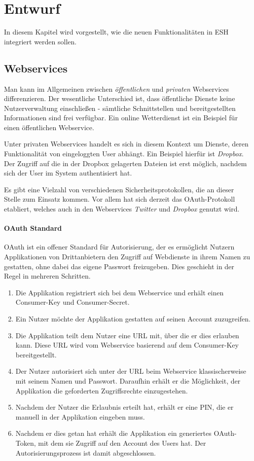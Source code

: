 \chapter{Entwurf}
\label{chap:entwurf}
In diesem Kapitel wird vorgestellt, wie die neuen Funktionalitäten in ESH integriert werden sollen.


\section{Webservices}
Man kann im Allgemeinen zwischen \textit{öffentlichen} und \textit{privaten} Webservices differenzieren. Der wesentliche Unterschied ist, dass öffentliche Dienste keine Nutzerverwaltung einschließen - sämtliche Schnittstellen und bereitgestellten Informationen sind frei verfügbar. Ein online Wetterdienst ist ein Beispiel für einen öffentlichen Webservice. 

Unter privaten Webservices handelt es sich in diesem Kontext um Dienste, deren Funktionalität von eingeloggten User abhängt. Ein Beispiel hierfür ist \textit{Dropbox}. Der Zugriff auf die in der Dropbox gelagerten Dateien ist erst möglich, nachdem sich der User im System authentisiert hat. 

Es gibt eine Vielzahl von verschiedenen Sicherheitsprotokollen, die an dieser Stelle zum Einsatz kommen. Vor allem hat sich derzeit das OAuth-Protokoll etabliert, welches auch in den Webservices \textit{Twitter} und \textit{Dropbox} genutzt wird.\\

\subsubsection{OAuth Standard}
OAuth ist ein offener Standard für Autorisierung, der es ermöglicht Nutzern Applikationen von Drittanbietern den Zugriff auf Webdienste in ihrem Namen zu gestatten, ohne dabei das eigene Passwort freizugeben. Dies geschieht in der Regel in mehreren Schritten.

\begin{enumerate}
\item Die Applikation registriert sich bei dem Webservice und erhält einen Consumer-Key und Consumer-Secret.
\item Ein Nutzer möchte der Applikation gestatten auf seinen Account zuzugreifen.
\item Die Applikation teilt dem Nutzer eine URL mit, über die er dies erlauben kann. Diese URL wird vom Webservice basierend auf dem Consumer-Key bereitgestellt. 
\item Der Nutzer autorisiert sich unter der URL beim Webservice klassischerweise mit seinem Namen und Passwort. Daraufhin erhält er die Möglichkeit, der Applikation die geforderten Zugriffsrechte einzugestehen.
\item Nachdem der Nutzer die Erlaubnis erteilt hat, erhält er eine PIN, die er manuell in der Applikation eingeben muss. 
\item Nachdem er dies getan hat erhält die Applikation ein generiertes OAuth-Token, mit dem sie Zugriff auf den Account des Users hat. Der Autorisierungsprozess ist damit abgeschlossen.
\end{enumerate}


